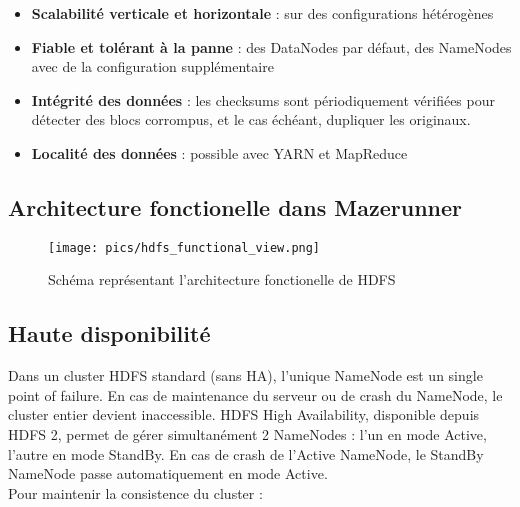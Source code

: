 \begin{itemize}
	\item \textbf{Scalabilité verticale et horizontale} : sur des configurations hétérogènes
	\item \textbf{Fiable et tolérant à la panne} : des DataNodes par défaut, des NameNodes avec de la configuration supplémentaire
	\item \textbf{Intégrité des données} : les checksums sont périodiquement vérifiées pour détecter des blocs corrompus, et le cas échéant, dupliquer les originaux.
	\item \textbf{Localité des données} : possible avec YARN et MapReduce
\end{itemize}

\subsection{Architecture fonctionelle dans Mazerunner}

\begin{figure}[h]
    \centering
    \texttt{[image: pics/hdfs\_functional\_view.png]}
    \caption{Schéma représentant l'architecture fonctionelle de HDFS}
\end{figure}
\FloatBarrier

\subsection{Haute disponibilité}

Dans un cluster HDFS standard (sans HA), l'unique NameNode est un single point of failure. En cas de maintenance du serveur ou de crash du NameNode, le cluster entier devient inaccessible. HDFS High Availability, disponible depuis HDFS 2, permet de gérer simultanément 2 NameNodes : l'un en mode Active, l'autre en mode StandBy. En cas de crash de l'Active NameNode, le StandBy NameNode passe automatiquement en mode Active.\\

Pour maintenir la consistence du cluster :


